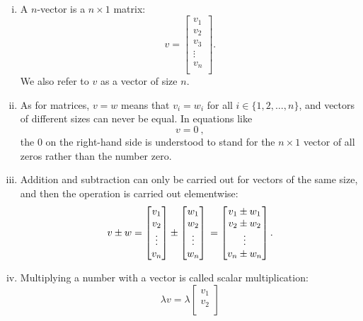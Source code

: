 \begin{definition}[Vectors]
\label{def:vectors}
~\\
\begin{enumerate}[(i)]
	\item A $n$-vector is a $n \times 1$ matrix:
		\[v = \begin{bmatrix}
		v_1 \\
		v_2 \\
		v_3 \\
		\vdots \\
		v_n \\
		\end{bmatrix}.\]
		We also refer to $v$ as a vector of size $n$.
	\item As for matrices, $v=w$ means that $v_i = w_i$ for all $i\in\{1,2,\dots,n\}$, and vectors of different sizes can never be equal. In equations like 
	\[ v = 0 \:, \]
	the $0$ on the right-hand side is understood to stand for the $n \times 1$ vector of all zeros rather than the number zero. 
	\item Addition and subtraction can only be carried out for vectors of the same size, and then the operation is carried out elementwise:
		\begin{equation*}
		v \pm w = \begin{bmatrix}
		v_1 \\
		v_2 \\
		\vdots \\
		v_n \\
		\end{bmatrix} \pm \begin{bmatrix}
		w_1 \\
		w_2 \\
		\vdots \\
		w_n \\
		\end{bmatrix} \\ = \begin{bmatrix}
		v_1 \pm w_1 \\
		v_2 \pm w_2 \\
		\vdots \\
		v_n \pm w_n \\
		\end{bmatrix}.
		\end{equation*}
	\item Multiplying a number with a vector is called scalar multiplication:
		\[ \lambda v = \lambda \begin{bmatrix}
		v_1 \\
		v_2 \\

\end{bmatrix}\]
\end{enumerate}
\end{definition}
